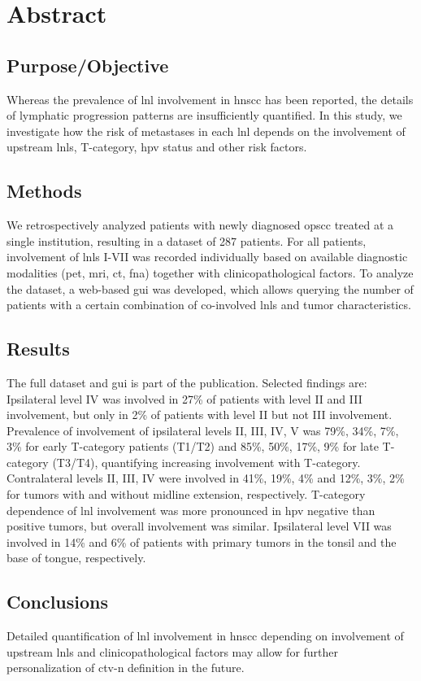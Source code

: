 \documentclass[\relativeRoot/main.tex]{subfiles}
\begin{document}
\section{Abstract}
\label{sec:dataset_usz:asbtract}

\subsection*{Purpose/Objective}

Whereas the prevalence of \gls{lnl} involvement in \gls{hnscc} has been reported, the details of lymphatic progression patterns are insufficiently quantified. In this study, we investigate how the risk of metastases in each \gls{lnl} depends on the involvement of upstream \glspl{lnl}, T-category, \gls{hpv} status and other risk factors.

\subsection*{Methods}

We retrospectively analyzed patients with newly diagnosed \gls{opscc} treated at a single institution, resulting in a dataset of 287 patients. For all patients, involvement of \glspl{lnl} I-VII was recorded individually based on available diagnostic modalities (\gls{pet}, \gls{mri}, \gls{ct}, \gls{fna}) together with clinicopathological factors. To analyze the dataset, a web-based \gls{gui} was developed, which allows querying the number of patients with a certain combination of co-involved \glspl{lnl} and tumor characteristics.

\subsection*{Results}

The full dataset and \gls{gui} is part of the publication. Selected findings are: Ipsilateral level IV was involved in 27\% of patients with level II and III involvement, but only in 2\% of patients with level II but not III involvement. Prevalence of involvement of ipsilateral levels II, III, IV, V was 79\%, 34\%, 7\%, 3\% for early T-category patients (T1/T2) and 85\%, 50\%, 17\%, 9\% for late T-category (T3/T4), quantifying increasing involvement with T-category. Contralateral levels II, III, IV were involved in 41\%, 19\%, 4\% and 12\%, 3\%, 2\% for tumors with and without midline extension, respectively. T-category dependence of \gls{lnl} involvement was more pronounced in \gls{hpv} negative than positive tumors, but overall involvement was similar. Ipsilateral level VII was involved in 14\% and 6\% of patients with primary tumors in the tonsil and the base of tongue, respectively.

\subsection*{Conclusions}

Detailed quantification of \gls{lnl} involvement in \gls{hnscc} depending on involvement of upstream \glspl{lnl} and clinicopathological factors may allow for further personalization of \gls{ctv-n} definition in the future.
\end{document}
